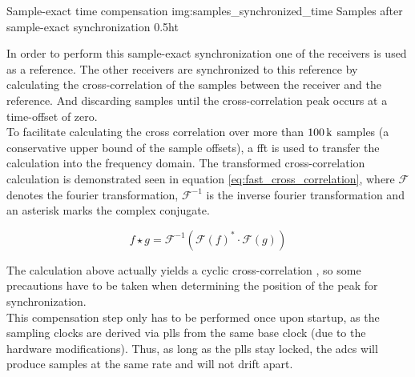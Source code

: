 \begin{subchapter}{Sample-exact time compensation}
               {img:samples_synchronized_time}
               {Samples after sample-exact synchronization}
               {0.5}{ht}

  In order to perform this sample-exact synchronization
  one of the receivers is used as a reference.
  The other receivers are synchronized to this reference
  by calculating the cross-correlation of the samples between
  the receiver and the reference.
  And discarding samples until the cross-correlation peak
  occurs at a time-offset of zero. \\

  To facilitate calculating the cross correlation over
  more than $\SI{100}{\kilo\relax}$ samples (a conservative
  upper bound of the sample offsets), a \acrlong{fft}
  is used to transfer the calculation into the frequency domain.
  The transformed cross-correlation calculation is demonstrated
  seen in equation \ref{eq:fast_cross_correlation}, where
  $\mathcal{F}$ denotes the fourier transformation,
  $\mathcal{F}^{-1}$ is the inverse fourier transformation
  and an asterisk marks the complex conjugate.

  \begin{equation}
    \label{eq:fast_cross_correlation}
    f \star g = \mathcal{F}^{-1}\left(
      \mathcal{F}\left( f \right)^{\ast}
      \cdot
      \mathcal{F}\left( g \right)
    \right)
  \end{equation}

  The calculation above actually yields a
  cyclic cross-correlation \cite[p. 329]{kammeyer2012},
  so some precautions have to be taken when
  determining the position of the peak for
  synchronization. \\

  This compensation step only has to be performed
  once upon startup, as the sampling clocks are
  derived via \glspl{pll} from the same base clock
  (due to the hardware modifications).
  Thus, as long as the \glspl{pll} stay locked,
  the \glspl{adc} will produce samples at the
  same rate and will not drift apart.
\end{subchapter}


